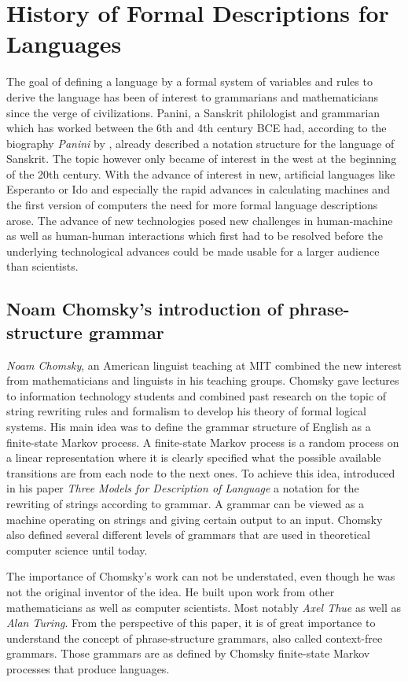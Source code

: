 \documentclass{article}
\begin{document}
\section{History of Formal Descriptions for Languages}
The goal of defining a language by a formal system of variables and rules to derive the language has been of interest to grammarians and mathematicians since the verge of civilizations. Panini, a Sanskrit philologist and grammarian which has worked between the 6th and 4th century BCE had, according to the biography \textit{Panini} by \citet{bhate2002panini}, already described a notation structure for the language of Sanskrit. The topic however only became of interest in the west at the beginning of the 20th century. With the advance of interest in new, artificial languages like Esperanto or Ido and especially the rapid advances in calculating machines and the first version of computers the need for more formal language descriptions arose. The advance of new technologies posed new challenges in human-machine as well as human-human interactions which first had to be resolved before the underlying technological advances could be made usable for a larger audience than scientists.

\subsection{Noam Chomsky's introduction of phrase-structure grammar}
\textit{Noam Chomsky}, an American linguist teaching at MIT combined the new interest from mathematicians and linguists in his teaching groups. Chomsky gave lectures to information technology students and combined past research on the topic of string rewriting rules and formalism to develop his theory of formal logical systems. His main idea was to define the grammar structure of English as a finite-state Markov process. A finite-state Markov process is a random process on a linear representation where it is clearly specified what the possible available transitions are from each node to the next ones. To achieve this idea, \citet{1056813} introduced in his paper \textit{Three Models for Description of Language} a notation for the rewriting of strings according to grammar. A grammar can be viewed as a machine operating on strings and giving certain output to an input. Chomsky also defined several different levels of grammars that are used in theoretical computer science until today.

The importance of Chomsky’s work can not be understated, even though he was not the original inventor of the idea. He built upon work from other mathematicians as well as computer scientists. Most notably \textit{Axel Thue} as well as \textit{Alan Turing}. From the perspective of this paper, it is of great importance to understand the concept of phrase-structure grammars, also called context-free grammars. Those grammars are as defined by Chomsky finite-state Markov processes that produce languages.
\end{document}

